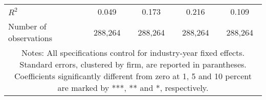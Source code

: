\begin{tabular}{lcccc}
\\
	$R^2$ 
				& 0.049 
				& 0.173 
				& 0.216 
				& 0.109 \\
	Number of observations 
				& 288,264 
				& 288,264 
				& 288,264 
				& 288,264 \\
\hline \hline
\multicolumn{ 5 }{c}{\begin{minipage}{\textwidth}
\small Notes: All specifications control for industry-year fixed effects. Standard errors, clustered by firm, are reported in parantheses. Coefficients significantly different from zero at 1, 5 and 10 percent are marked by ***, ** and *, respectively.

  \end{minipage} } \\
\end{tabular}